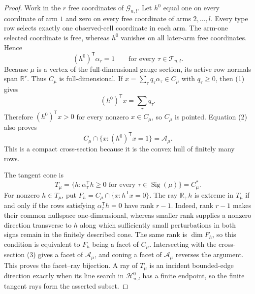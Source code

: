 \documentclass{article}
\begin{document}
\begin{proof}
Work in the \(r\) free coordinates of \(\mathcal G_{n,l}\). Let \(h^0\) equal one on every coordinate of arm \(1\) and zero on every free coordinate of arms \(2,\ldots,l\). Every type row selects exactly one observed-cell coordinate in each arm. The arm-one selected coordinate is free, whereas \(h^0\) vanishes on all later-arm free coordinates. Hence
\[(h^0)^{\mathsf T}\alpha_\tau=1\qquad\text{for every }\tau\in\mathcal T_{n,l}.\tag{1}\]
Because \(\mu\) is a vertex of the full-dimensional gauge section, its active row normals span \(\mathbb R^r\). Thus \(C_\mu\) is full-dimensional. If \(x=\sum_\tau q_\tau\alpha_\tau\in C_\mu\) with \(q_\tau\ge0\), then (1) gives
\[(h^0)^{\mathsf T}x=\sum_\tau q_\tau.\tag{2}\]
Therefore \((h^0)^{\mathsf T}x>0\) for every nonzero \(x\in C_\mu\), so \(C_\mu\) is pointed. Equation (2) also proves
\[C_\mu\cap\{x:(h^0)^{\mathsf T}x=1\}=\mathcal A_\mu.\tag{3}\]
This is a compact cross-section because it is the convex hull of finitely many rows.

The tangent cone is
\[T_\mu=\{h:\alpha_\tau^{\mathsf T}h\ge0\text{ for every }\tau\in\operatorname{Sig}(\mu)\}=C_\mu^*.\tag{4}\]
For nonzero \(h\in T_\mu\), put \(F_h=C_\mu\cap\{x:h^{\mathsf T}x=0\}\). The ray \(\mathbb R_+h\) is extreme in \(T_\mu\) if and only if the rows satisfying \(\alpha_\tau^{\mathsf T}h=0\) have rank \(r-1\). Indeed, rank \(r-1\) makes their common nullspace one-dimensional, whereas smaller rank supplies a nonzero direction transverse to \(h\) along which sufficiently small perturbations in both signs remain in the finitely described cone. The same rank is \(\dim F_h\), so this condition is equivalent to \(F_h\) being a facet of \(C_\mu\). Intersecting with the cross-section (3) gives a facet of \(\mathcal A_\mu\), and coning a facet of \(\mathcal A_\mu\) reverses the argument. This proves the facet--ray bijection. A ray of \(T_\mu\) is an incident bounded-edge direction exactly when its line search in \(\mathcal H^0_{n,l}\) has a finite endpoint, so the finite tangent rays form the asserted subset.


\end{proof}
\end{document}

